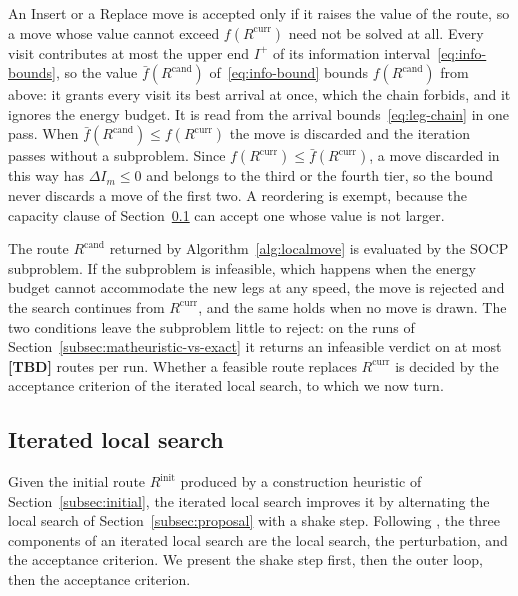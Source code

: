 \documentclass[11pt]{article}
\newcommand{\Rcurr}{R^{\mathrm{curr}}}   %
\newcommand{\Rcand}{R^{\mathrm{cand}}}   %
\newcommand{\Rinit}{R^{\mathrm{init}}}   %
\newcommand{\tbd}{\textbf{[TBD]}}   %
\let\originalsubsection\subsection
\renewcommand{\subsection}{\FloatBarrier\originalsubsection}
\begin{document}
An Insert or a Replace move is accepted only if it raises the value of the route, so a move whose value cannot exceed $f(\Rcurr)$ need not be solved at all. Every visit contributes at most the upper end $I^+$ of its information interval~\eqref{eq:info-bounds}, so the value $\bar{f}(\Rcand)$ of~\eqref{eq:info-bound} bounds $f(\Rcand)$ from above: it grants every visit its best arrival at once, which the chain forbids, and it ignores the energy budget. It is read from the arrival bounds~\eqref{eq:leg-chain} in one pass. When $\bar{f}(\Rcand) \le f(\Rcurr)$ the move is discarded and the iteration passes without a subproblem. Since $f(\Rcurr) \le \bar{f}(\Rcurr)$, a move discarded in this way has $\Delta I_m \le 0$ and belongs to the third or the fourth tier, so the bound never discards a move of the first two. A reordering is exempt, because the capacity clause of Section~\ref{subsec:ils} can accept one whose value is not larger.

The route $\Rcand$ returned by Algorithm~\ref{alg:localmove} is evaluated by the SOCP subproblem. If the subproblem is infeasible, which happens when the energy budget cannot accommodate the new legs at any speed, the move is rejected and the search continues from $\Rcurr$, and the same holds when no move is drawn. The two conditions leave the subproblem little to reject: on the runs of Section~\ref{subsec:matheuristic-vs-exact} it returns an infeasible verdict on at most \tbd{} routes per run.
 Whether a feasible route replaces $\Rcurr$ is decided by the acceptance criterion of the iterated local search, to which we now turn.

\subsection{Iterated local search}\label{subsec:ils}\label{subsec:perturbation}

Given the initial route $\Rinit$ produced by a construction heuristic of Section~\ref{subsec:initial}, the iterated local search improves it by alternating the local search of Section~\ref{subsec:proposal} with a shake step. Following \citep{gunawan2015iterated}, the three components of an iterated local search are the local search, the perturbation, and the acceptance criterion. We present the shake step first, then the outer loop, then the acceptance criterion.
\end{document}
